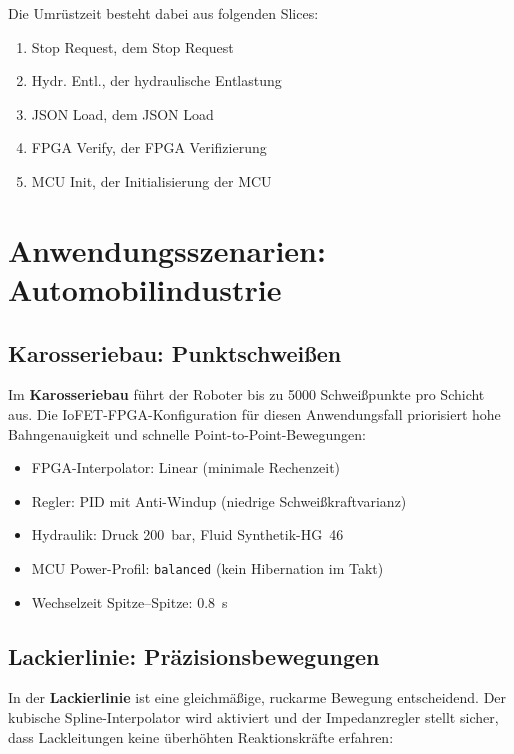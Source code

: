 ﻿\documentclass[a4paper,12pt]{scrreprt}
\theoremstyle{definition}
\begin{document}
Die Umrüstzeit besteht dabei aus folgenden Slices:
\begin{enumerate}
	\item Stop Request, dem Stop Request
	\item Hydr. Entl., der hydraulische Entlastung
	\item JSON Load, dem JSON Load
	\item FPGA Verify, der FPGA Verifizierung
	\item MCU Init, der Initialisierung der MCU
\end{enumerate}
\section{Anwendungsszenarien: Automobilindustrie}

\subsection{Karosseriebau: Punktschweißen}

Im \textbf{Karosseriebau} führt der Roboter bis zu 5000 Schweißpunkte
pro Schicht aus. Die IoFET-FPGA-Konfiguration für diesen Anwendungsfall
priorisiert hohe Bahngenauigkeit und schnelle Point-to-Point-Bewegungen:

\begin{itemize}
  \item FPGA-Interpolator: Linear (minimale Rechenzeit)
  \item Regler: PID mit Anti-Windup (niedrige Schweißkraftvarianz)
  \item Hydraulik: Druck \SI{200}{\bar}, Fluid Synthetik-HG~46
  \item MCU Power-Profil: \texttt{balanced} (kein Hibernation im Takt)
  \item Wechselzeit Spitze--Spitze: \SI{0.8}{\second}
\end{itemize}

\subsection{Lackierlinie: Präzisionsbewegungen}

In der \textbf{Lackierlinie} ist eine gleichmäßige, ruckarme
Bewegung entscheidend. Der kubische Spline-Interpolator wird aktiviert
und der Impedanzregler stellt sicher, dass Lackleitungen keine
überhöhten Reaktionskräfte erfahren:
\end{document}
